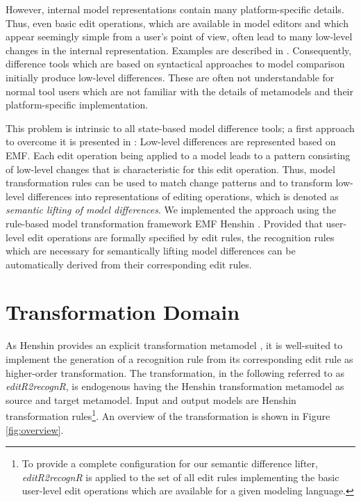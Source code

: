 \documentclass{llncs}
\begin{document}
However, internal model representations contain many platform-specific 
details. Thus, even basic edit operations, which are available in model editors
and which appear seemingly simple from a user's point of view, often lead 
to many low-level changes in the internal representation.
Examples are described in \cite{KeKT2011ASE}\cite{Ke2010SE}\cite{KeS2008CVSM}.
Consequently, difference tools which are based on syntactical approaches to model 
comparison initially produce low-level differences. These are often not 
understandable for normal tool users which are not familiar with
the details of metamodels and their platform-specific implementation.

This problem is intrinsic to all state-based model difference tools; a first approach
to overcome it is presented in \cite{KeKT2011ASE}: 
Low-level differences are represented based on EMF.
Each edit operation being applied to a model leads
to a pattern consisting of low-level changes
that is characteristic for this edit operation.
Thus, model transformation rules can be used to match change patterns 
and to transform low-level differences into representations of editing
operations, which is denoted as \textit{semantic lifting of model differences}.
We implemented the approach using the rule-based model transformation framework 
EMF Henshin \cite{Henshin}.
Provided that user-level edit operations are formally specified
by edit rules, the recognition rules which are necessary for
semantically lifting model differences can be automatically
derived from their corresponding edit rules.

\section{Transformation Domain}
\label{sec:domain}
As Henshin provides an explicit transformation metamodel \cite{Arendt2010},
it is well-suited to implement the generation of
a recognition rule from its corresponding edit rule as 
higher-order transformation.
The transformation, in the following referred to as \textit{editR2recognR}, 
is endogenous \cite{CzH2006IBM} having the Henshin transformation metamodel 
as source and target metamodel. Input and output models
are Henshin transformation rules\footnote{To provide a complete configuration for our semantic difference lifter,
\textit{editR2recognR} is applied to the set of all edit rules implementing
the basic user-level edit operations which are available for a given modeling
language.}. An overview of the transformation is shown
in Figure \ref{fig:overview}.
\end{document}
